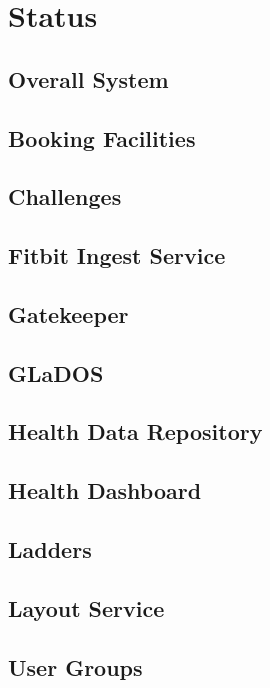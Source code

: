 \chapter{Status}

\section{Overall System}
    

\section{Booking Facilities}
    

\section{Challenges}
    

\section{Fitbit Ingest Service}
    

\section{Gatekeeper}
    

\section{GLaDOS}
    

\section{Health Data Repository}
    

\section{Health Dashboard}
    

\section{Ladders}
    

\section{Layout Service}
    

\section{User Groups}
    